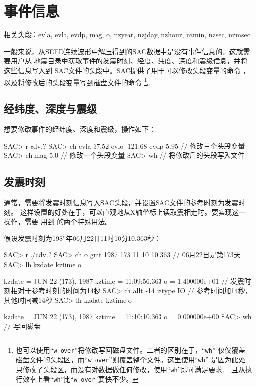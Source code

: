 \section{事件信息}
\label{sec:event-info}
相关头段：evla, evlo, evdp, mag, o, nzyear, nzjday, nzhour, nzmin, nzsec, nzmsec

一般来说，从SEED连续波形中解压得到的SAC数据中是没有事件信息的。这就需要用户从
地震目录中获取事件的发震时刻、经度、纬度、深度和震级信息，并将这些信息写入到
SAC文件的头段中。SAC提供了用于可以修改头段变量的命令 ，
以及将修改后的头段变量写到磁盘文件的命令 
\footnote{
也可以使用``\texttt{w over}''将修改写回磁盘文件。二者的区别在于，``\texttt{wh}''
仅仅覆盖磁盘文件的头段区，而``\texttt{w over}''则覆盖整个文件。这里使用``\texttt{wh}''
是因为此处只修改了头段区，而没有对数据做任何修改，使用``\texttt{wh}''即可满足要求，
且从执行效率上看``\texttt{wh}''比``\texttt{w over}''要快不少。}。

\subsection{经纬度、深度与震级}
想要修改事件的经纬度、深度和震级，操作如下：
\begin{SACCode}
SAC> r cdv.?
SAC> ch evla 37.52 evlo -121.68 evdp 5.95   // 修改三个头段变量
SAC> ch mag 5.0                             // 修改一个头段变量
SAC> wh                                     // 将修改后的头段写入文件
\end{SACCode}

\subsection{发震时刻}
通常，需要将发震时刻信息写入SAC头段，并设置SAC文件的参考时刻为发震时刻。
这样设置的好处在于，可以直观地从X轴坐标上读取震相走时。要实现这一操作，需要
用到  的两个特殊用法。

假设发震时刻为1987年06月22日11时10分10.363秒：
\label{code:origin-time}
\begin{SACCode}
SAC> r ./cdv.?
SAC> ch o gmt 1987 173 11 10 10 363   // 06月22日是第173天
SAC> lh kzdate kztime o

     kzdate = JUN 22 (173), 1987
     kztime = 11:09:56.363
          o = 1.400000e+01       // 发震时刻相对于参考时刻的时间为14秒
SAC> ch allt -14 iztype IO       // 参考时间加14秒，其他时间减14秒
SAC> lh kzdate kztime o

     kzdate = JUN 22 (173), 1987
     kztime = 11:10:10.363
          o = 0.000000e+00
SAC> wh                          // 写回磁盘
\end{SACCode}

